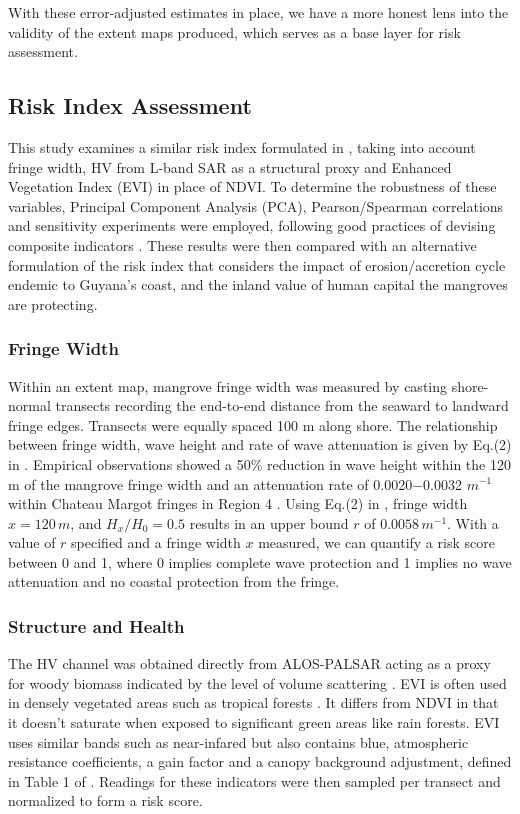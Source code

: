 \documentclass[final-report]{report-template}
\begin{document}
With these error-adjusted estimates in place, we have a more honest lens into the validity of the extent maps produced, which serves as a base layer for risk assessment.

\subsection{Risk Index Assessment}
This study examines a similar risk index formulated in \textcite{Xu2024}, taking into account fringe width, HV from L-band SAR as a structural proxy and Enhanced Vegetation Index (EVI) in place of NDVI. To determine the robustness of these variables, Principal Component Analysis (PCA), Pearson/Spearman correlations and sensitivity experiments were employed, following good practices of devising composite indicators \parencite{JRC2008}. These results were then compared with an alternative formulation of the risk index that considers the impact of erosion/accretion cycle endemic to Guyana's coast, and the inland value of human capital the mangroves are protecting.

\subsubsection{Fringe Width}
Within an extent map, mangrove fringe width was measured by casting shore-normal transects recording the end-to-end distance from the seaward to landward fringe edges.  Transects were equally spaced 100 m along shore. The relationship between fringe width, wave height and rate of wave attenuation is given by Eq.(2) in \textcite{Mazda2006}. Empirical observations showed a 50\% reduction in wave height within the 120 m of the mangrove fringe width and an attenuation rate of  0.0020$-$0.0032 $m^{-1}$ within Chateau Margot fringes in Region 4 \parencite{Best2022}. Using Eq.(2) in \textcite{Mazda2006}, fringe width $x = 120\,m$, and $H_{x}/{H_0} = 0.5$ results in an upper bound $r$ of $ 0.0058\,m^{-1}$. With a value of $r$ specified and a fringe width $x$ measured, we can quantify a risk score between 0 and 1, where 0 implies complete wave protection and 1 implies no wave attenuation and no coastal protection from the fringe. 

\subsubsection{Structure and Health}
The HV channel was obtained directly from ALOS-PALSAR acting as a proxy for woody biomass indicated by the level of volume scattering \parencite{Saatchi2019}. EVI is often used in densely vegetated areas such as tropical forests \parencite{Zeng2022}. It differs from NDVI in that it doesn't saturate when exposed to significant green areas like rain forests. EVI uses similar bands such as near-infared but also contains blue, atmospheric resistance coefficients, a gain factor and a canopy background adjustment, defined in Table 1 of \textcite{Zeng2022}. Readings for these indicators were then sampled per transect and normalized to form a risk score. 
\end{document}
